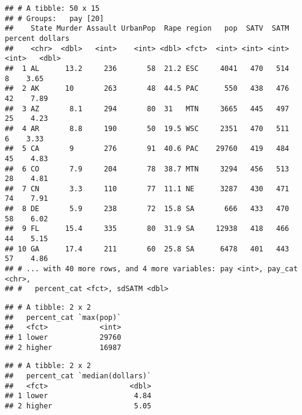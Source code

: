 \documentclass[
]{article}
\newenvironment{Shaded}{\begin{snugshade}}{\end{snugshade}}
\newcommand{\CommentTok}[1]{\textcolor[rgb]{0.56,0.35,0.01}{\textit{#1}}}
\newcommand{\KeywordTok}[1]{\textcolor[rgb]{0.13,0.29,0.53}{\textbf{#1}}}
\newcommand{\NormalTok}[1]{#1}
\newcommand{\OperatorTok}[1]{\textcolor[rgb]{0.81,0.36,0.00}{\textbf{#1}}}
\begin{document}
\begin{verbatim}
## # A tibble: 50 x 15
## # Groups:   pay [20]
##    State Murder Assault UrbanPop  Rape region   pop  SATV  SATM percent dollars
##    <chr>  <dbl>   <int>    <int> <dbl> <fct>  <int> <int> <int>   <int>   <dbl>
##  1 AL      13.2     236       58  21.2 ESC     4041   470   514       8    3.65
##  2 AK      10       263       48  44.5 PAC      550   438   476      42    7.89
##  3 AZ       8.1     294       80  31   MTN     3665   445   497      25    4.23
##  4 AR       8.8     190       50  19.5 WSC     2351   470   511       6    3.33
##  5 CA       9       276       91  40.6 PAC    29760   419   484      45    4.83
##  6 CO       7.9     204       78  38.7 MTN     3294   456   513      28    4.81
##  7 CN       3.3     110       77  11.1 NE      3287   430   471      74    7.91
##  8 DE       5.9     238       72  15.8 SA       666   433   470      58    6.02
##  9 FL      15.4     335       80  31.9 SA     12938   418   466      44    5.15
## 10 GA      17.4     211       60  25.8 SA      6478   401   443      57    4.86
## # ... with 40 more rows, and 4 more variables: pay <int>, pay_cat <chr>,
## #   percent_cat <fct>, sdSATM <dbl>
\end{verbatim}

\begin{Shaded}
\end{Shaded}

\begin{verbatim}
## # A tibble: 2 x 2
##   percent_cat `max(pop)`
##   <fct>            <int>
## 1 lower            29760
## 2 higher           16987
\end{verbatim}

\begin{Shaded}
\end{Shaded}

\begin{verbatim}
## # A tibble: 2 x 2
##   percent_cat `median(dollars)`
##   <fct>                   <dbl>
## 1 lower                    4.84
## 2 higher                   5.05
\end{verbatim}
\end{document}
